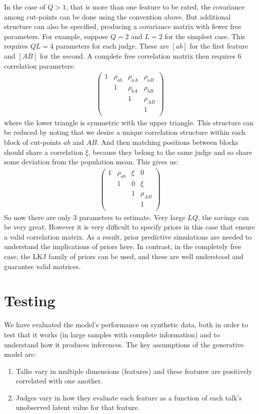 \documentclass[reqno ,11pt]{amsart}
\begin{document}
In the case of $Q>1$, that is more than one feature to be rated, the covariance among cut-points can be done using the convention above. But additional structure can also be specified, producing a covariance matrix with fewer free parameters. For example, suppose $Q=2$ and $L=2$ for the simplest case. This requires $QL=4$ parameters for each judge. These are $[ab]$ for the first feature and $[AB]$ for the second. A complete free correlation matrix then requires 6 correlation parameters:
\begin{align*}
  \begin{pmatrix}
    1 & \rho_{ab} & \rho_{aA} & \rho_{aB} \\
     & 1 & \rho_{bA} & \rho_{bB} \\
     & & 1 & \rho_{AB} \\
     &  &  & 1 \\
  \end{pmatrix}
\end{align*}
where the lower triangle is symmetric with the upper triangle. This structure can be reduced by noting that we desire a unique correlation structure within each block of cut-points $ab$ and $AB$. And then matching positions between blocks should share a correlation $\xi$, because they belong to the same judge and so share some deviation from the population mean. This gives us:
\begin{align*}
  \begin{pmatrix}
    1 & \rho_{ab} & \xi & 0 \\
     & 1 & 0 & \xi \\
     & & 1 & \rho_{AB} \\
     &  &  & 1 \\
  \end{pmatrix}
\end{align*}
So now there are only 3 parameters to estimate. Very large $LQ$, the savings can be very great. However it is very difficult to specify priors in this case that ensure a valid correlation matrix. As a result, prior predictive simulations are needed to understand the implications of priors here. In contrast, in the completely free case, the LKJ family of priors can be used, and these are well understood and guarantee valid matrices.

\newpage
\section{Testing}

We have evaluated the model's performance on synthetic data, both in order to test that it works (in large samples with complete information) and to understand how it produces inferences. The key assumptions of the generative model are: 
\begin{enumerate}
  \item Talks vary in multiple dimensions (features) and these features are positively correlated with one another.
  \item Judges vary in how they evaluate each feature as a function of each talk's unobserved latent value for that feature.
\end{enumerate}
\end{document}
